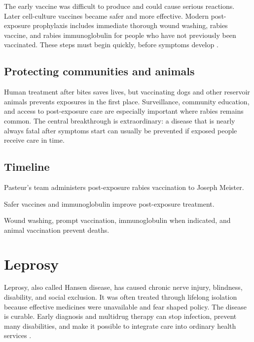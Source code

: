 \documentclass[12pt,oneside]{book}
\begin{document}
The early vaccine was difficult to produce and could cause serious reactions.
Later cell-culture vaccines became safer and more effective. Modern
post-exposure prophylaxis includes immediate thorough wound washing,
rabies vaccine, and rabies immunoglobulin for people who have not previously
been vaccinated. These steps must begin quickly, before symptoms develop
\cite{cdcRabiesEID}.

\section{Protecting communities and animals}
Human treatment after bites saves lives, but vaccinating dogs and other
reservoir animals prevents exposures in the first place. Surveillance,
community education, and access to post-exposure care are especially important
where rabies remains common. The central breakthrough is extraordinary: a
disease that is nearly always fatal after symptoms start can usually be
prevented if exposed people receive care in time.

\section*{Timeline}
\begin{description}[leftmargin=2.3cm,style=nextline]
  \item[1885] Pasteur's team administers post-exposure rabies vaccination to Joseph Meister.
  \item[Twentieth century] Safer vaccines and immunoglobulin improve post-exposure treatment.
  \item[Today] Wound washing, prompt vaccination, immunoglobulin when indicated, and animal vaccination prevent deaths.
\end{description}

\chapter[Leprosy]{Leprosy}

Leprosy, also called Hansen disease, has caused chronic nerve injury,
blindness, disability, and social exclusion. It was often treated through
lifelong isolation because effective medicines were unavailable and fear
shaped policy. The disease is curable. Early diagnosis and multidrug therapy
can stop infection, prevent many disabilities, and make it possible to
integrate care into ordinary health services \cite{whoLeprosy,whoLeprosyMDT}.
\end{document}

